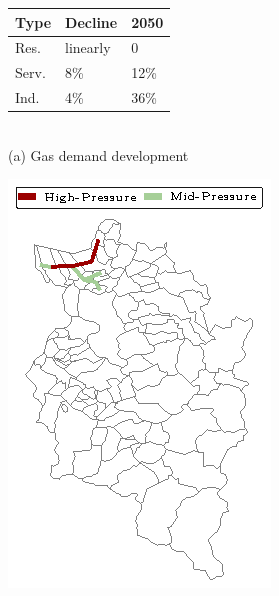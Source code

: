 \documentclass[aspectratio=169]{beamer}
\begin{document}
\begin{frame}{}
\begin{minipage}{.3\textwidth}
\centering

\begin{tabularx}{1\linewidth}{XXX}
\toprule
Type & Decline & 2050 \\
\midrule
Res. & linearly & 0\\
Serv. & 8\% & 12\%\\
Ind. & 4\% & 36\%\\
\bottomrule
\end{tabularx}\\
\vspace{0.25cm}
\tiny (a) Gas demand development


\end{minipage}
\begin{minipage}{.75\textwidth}
\centering
\hspace{0.cm}
\includegraphics[width=.5\linewidth]{network.eps}
\end{minipage}
\end{frame}
\end{document}
